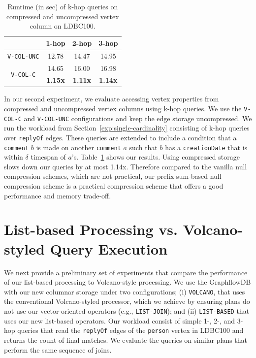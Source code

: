 \begin{table}
	\centering
	\bgroup
	\setlength{\tabcolsep}{8pt}
	\def\arraystretch{1.2}%
	\begin{tabular}{ |c|c|c|c| } 
		\hline
		& \textbf{1-hop} & \textbf{2-hop} & \textbf{3-hop} \\
		\hline \hline
		\texttt{V-COL-UNC}& 12.78 & 14.47 & 14.95\\ 
		\hline
		\multirow{2}{*}{\texttt{V-COL-C}}& 14.65 & 16.00 & 16.98 \\ 
		& \textbf{1.15x} & \textbf{1.11x} & \textbf{1.14x}\\ 
		\hline  
	\end{tabular}
	\egroup
	\captionsetup{justification=centering}
	\caption{Runtime (in sec) of k-hop queries on compressed and uncompressed vertex column on LDBC100.}
	\label{tbl:s3}
\end{table}

In our second experiment, we evaluate accessing vertex properties from compressed and uncompressed vertex columns using k-hop queries. We use the \texttt{V-COL-C} and \texttt{V-COL-UNC} configurations and keep the edge storage uncompressed. We run the workload from Section~\ref{exp:single-cardinality} consisting of k-hop queries over \texttt{replyOf} edges. These queries are extended to include a condition that a \texttt{comment} $b$ is made on another \texttt{comment} $a$ such that $b$ has a \texttt{creationDate} that is within $\delta$ timespan of $a$'s. Table~\ref{tbl:s3} shows our results. Using compressed storage slows down our queries by at most 1.14x. Therefore compared to the vanilla null compression schemes, which are not practical, our prefix sum-based null compression scheme is a practical compression scheme that offers a good performance and memory trade-off.

\section{List-based Processing vs. Volcano-styled Query Execution}
\label{exp:list-based}

We next provide a preliminary set of experiments that compare the performance of our list-based processing to Volcano-style processing. We use the GraphflowDB with our new columnar storage under two configurations; (i) \texttt{VOLCANO}, that uses the conventional Volcano-styled processor, which we achieve by ensuring plans do not use our vector-oriented operators (e.g., \texttt{LIST-JOIN}); and (ii) \texttt{LIST-BASED} that uses our new list-based operators. Our workload consist of simple 1-, 2-, and 3-hop queries that read the \texttt{replyOf} edges of the \texttt{person} vertex in LDBC100 and returns the count of final matches. We evaluate the queries on similar plans that perform the same sequence of joins.

